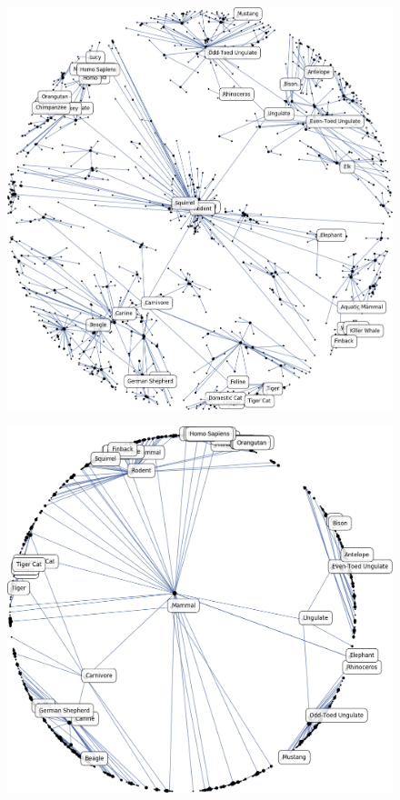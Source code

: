 \documentclass[11pt]{article}
\begin{document}
\begin{figure}
  \centering
  \begin{minipage}[b]{0.45\linewidth}
    \includegraphics[width=0.9\linewidth]{plot_wn_mammals_intermediate_crop}
    \label{fig:mammals_intermediate}
  \end{minipage}
  \hspace{2em}
  \begin{minipage}[b]{0.45\linewidth}
    \includegraphics[width=\linewidth]{plot_wn_mammals_converged_crop}

\end{minipage}
\end{figure}
\end{document}
